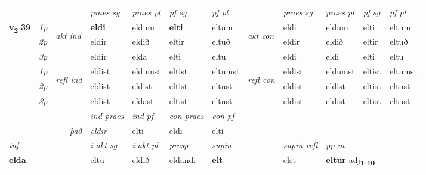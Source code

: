 \begin{longtable}[l]{X>{\footnotesize\itshape}llXXXXlXXXX}
 & &   & \textit{praes sg}  & \textit{praes pl}    & \textit{ pf sg} & \textit{pf pl} & & \textit{praes sg}  & \textit{praes pl}    & \textit{pf sg} & \textit{pf pl }  \\ \cmidrule{4-7} \cmidrule{9-12}
 \multirow{2}{*}{{{\textbf{v{\textsubscript{2}}} \Large{\textbf{39}}}}}  & 1p & \multirow{3}{*}{\begin{turn}{90}\textit{akt ind}\end{turn}} & \textbf{eldi} & eldum & \textbf{elti} & eltum & \multirow{3}{*}{\begin{turn}{90}\textit{akt con}\end{turn}} &eldi & eldum & elti & eltum\\*
 & 2p &  &  eldir  & eldið & eltir & eltuð & & eldir & eldið & eltir & eltuð \\*
 & 3p &  & eldir & elda & elti & eltu & & eldi & eldi& elti & eltu \\*
\cmidrule{4-7} \cmidrule{9-12}
 & 1p & \multirow{3}{*}{\begin{turn}{90}\textit{refl ind}\end{turn}}  & eldist & eldumst & eltist & eltumst & \multirow{3}{*}{\begin{turn}{90}\textit{refl con}\end{turn}}  &eldist & eldumst & eltist & eltumst \\*
 & 2p &  & eldist & eldist & eltist & eltust & &eldist & eldist & eltist & eltust \\*
 & 3p  & & eldist & eldast & eltist & eltust & & eldist & eldist& eltist & eltust \\*
\cmidrule{4-7} \cmidrule{9-12}

   && &  \textit{ind praes} & \textit{ind pf} & \textit{con praes} & \textit{con pf} \\*
\multicolumn{3}{r}{\textit{það}} & eldir & elti & eldi & elti \\*

\cmidrule{4-7}
   {\textit{inf}} & &  & \textit{i akt sg} & \textit{i akt pl}   & \textit{presp} & \textit{supin} && \textit{supin refl} & \textit{pp m} \\*
  {\textbf{elda}} & && eltu  & eldið   & eldandi &  \textbf{elt} && elst & \multicolumn{2}{l}{\textbf{eltur} adj\textbf{\textsubscript{1-10}}} \\*

\midrule


\end{longtable}
